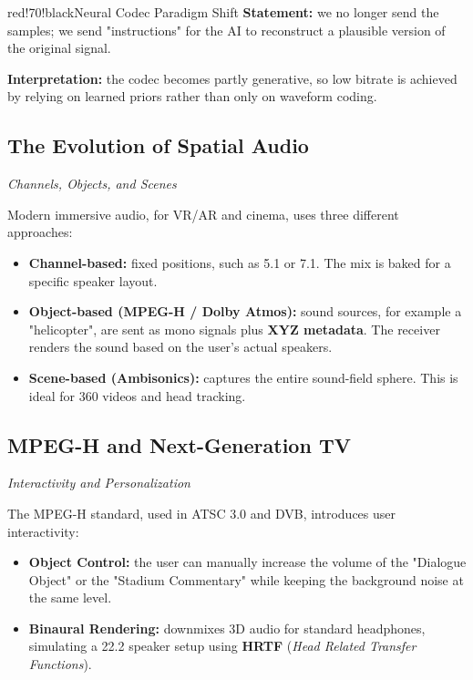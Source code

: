 \begin{calloutbox}{red!70!black}{Neural Codec Paradigm Shift}
\textbf{Statement:} we no longer send the samples; we send "instructions" for the AI to reconstruct a plausible version of the original signal.

\textbf{Interpretation:} the codec becomes partly generative, so low bitrate is achieved by relying on learned priors rather than only on waveform coding.
\end{calloutbox}

\subsection{The Evolution of Spatial Audio}

\textit{Channels, Objects, and Scenes}

Modern immersive audio, for VR/AR and cinema, uses three different approaches:

\begin{itemize}
\item \textbf{Channel-based:} fixed positions, such as 5.1 or 7.1. The mix is baked for a specific speaker layout.
\item \textbf{Object-based (MPEG-H / Dolby Atmos):} sound sources, for example a "helicopter", are sent as mono signals plus \textbf{XYZ metadata}. The receiver renders the sound based on the user's actual speakers.
\item \textbf{Scene-based (Ambisonics):} captures the entire sound-field sphere. This is ideal for 360 videos and head tracking.
\end{itemize}

\subsection{MPEG-H and Next-Generation TV}

\textit{Interactivity and Personalization}

The MPEG-H standard, used in ATSC 3.0 and DVB, introduces user interactivity:

\begin{itemize}
\item \textbf{Object Control:} the user can manually increase the volume of the "Dialogue Object" or the "Stadium Commentary" while keeping the background noise at the same level.
\item \textbf{Binaural Rendering:} downmixes 3D audio for standard headphones, simulating a 22.2 speaker setup using \textbf{HRTF} (\textit{Head Related Transfer Functions}).
\end{itemize}

